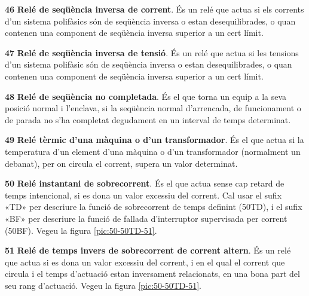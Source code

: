 \begin{multicols}{2}
\begin{list}{}
\item[\textbf{46}]   
\textbf{Relé de seqüència inversa de corrent}. És un relé que actua si els corrents
 d'un sistema polifàsics són de seqüència inversa o estan
desequilibrades, o quan contenen una component de seqüència inversa
superior a un cert límit.

\item[\textbf{47}]   
\textbf{Relé de seqüència inversa de tensió}. És un relé que actua si les tensions d'un sistema polifàsic són de seqüència inversa o estan
desequilibrades, o quan contenen una component de seqüència inversa
superior a un cert límit.

\item[\textbf{48}]   
\textbf{Relé de seqüència no completada}. És el que torna un equip a la seva posició normal  i
l'enclava, si la seqüència normal d'arrencada, de funcionament o de
parada no s'ha completat degudament en un interval de temps
determinat.

\item[\textbf{49}]  
\textbf{Relé tèrmic d'una màquina o d'un transformador}. És el que
actua si la temperatura d'un element d'una màquina o d'un
transformador (normalment un debanat), per on circula el corrent,
supera un valor determinat.

\item[\textbf{50}]   
\textbf{Relé instantani de sobrecorrent}. És el que actua sense cap retard de temps intencional, si es dona un valor excessiu del
corrent. Cal usar el sufix «TD» per descriure la funció de sobrecorrent de temps definint (50TD), i el sufix «BF» per descriure la funció de fallada d'interruptor supervisada per corrent (50BF). Vegeu la figura \vref{pic:50-50TD-51}.

\item[\textbf{51}]  
\textbf{Relé de temps invers  de sobrecorrent de corrent altern}. És
un relé que actua si es dona un valor excessiu del corrent, i en el qual el corrent que circula i el temps d'actuació estan inversament relacionats, en una bona part del seu rang d'actuació. Vegeu la figura \vref{pic:50-50TD-51}.


\end{list}
\end{multicols}
